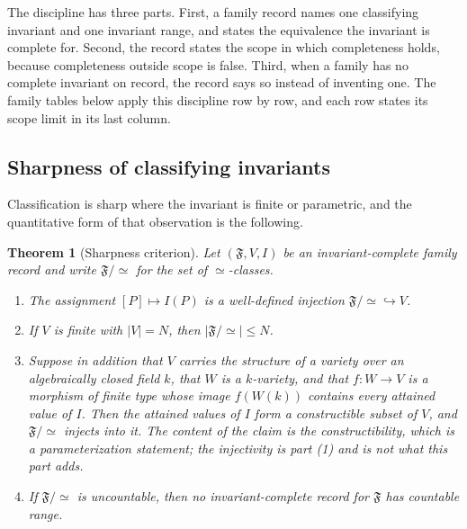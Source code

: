 \documentclass[11pt,letterpaper]{article}
\newtheorem{theorem}{Theorem}[section]
\theoremstyle{definition}
\theoremstyle{remark}
\begin{document}
The discipline has three parts. First, a family record names one classifying invariant and one invariant range, and states the equivalence the invariant is complete for. Second, the record states the scope in which completeness holds, because completeness outside scope is false. Third, when a family has no complete invariant on record, the record says so instead of inventing one. The family tables below apply this discipline row by row, and each row states its scope limit in its last column.

\subsection{Sharpness of classifying invariants}
\label{sec:sharpness}

Classification is sharp where the invariant is finite or parametric, and the quantitative form of that observation is the following.

\begin{theorem}[Sharpness criterion]
\label{thm:sharpness}
Let $(\mathfrak{F}, V, I)$ be an invariant-complete family record and write $\mathfrak{F}/\!\simeq$ for the set of $\simeq$-classes.
\begin{enumerate}
\item The assignment $[P] \mapsto I(P)$ is a well-defined injection $\mathfrak{F}/\!\simeq \hookrightarrow V$.
\item If $V$ is finite with $|V| = N$, then $|\mathfrak{F}/\!\simeq| \leq N$.
\item Suppose in addition that $V$ carries the structure of a variety over an algebraically closed field $k$, that $W$ is a $k$-variety, and that $f \colon W \to V$ is a morphism of finite type whose image $f(W(k))$ contains every attained value of $I$. Then the attained values of $I$ form a constructible subset of $V$, and $\mathfrak{F}/\!\simeq$ injects into it. The content of the claim is the constructibility, which is a parameterization statement; the injectivity is part (1) and is not what this part adds.
\item If $\mathfrak{F}/\!\simeq$ is uncountable, then no invariant-complete record for $\mathfrak{F}$ has countable range.
\end{enumerate}
\end{theorem}
\end{document}
